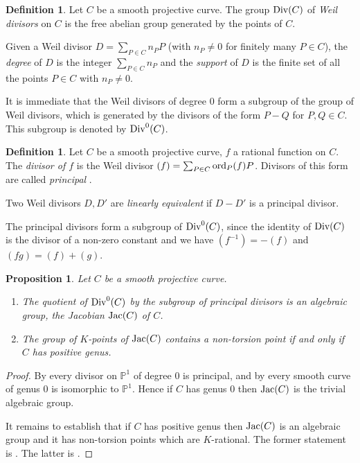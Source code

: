\documentclass{amsart}
\theoremstyle{plain}
\newtheorem{prop}[thm]{Proposition}
\theoremstyle{definition}
\newtheorem{defn}[thm]{Definition}
\newcommand{\Jac}{\textnormal{Jac}}
\newcommand{\Div}{\textnormal{Div}}
\newcommand{\ord}{\textnormal{ord}}
\begin{document}
\begin{defn}
	Let $C$ be a smooth projective curve. The group $\Div(C)$ of \emph{Weil divisors} on $C$ is the free abelian group generated by the points of $C$.
	
	Given a Weil divisor $D=\sum_{P \in C} n_P P$ (with $n_P \neq 0$ for finitely many $P \in C$), the \emph{degree} of $D$ is the integer $\sum_{P \in C} n_P$ and the \emph{support} of $D$ is the finite set of all the points $P\in C$ with $n_P\neq 0$. 
\end{defn}

It is immediate that the Weil divisors of degree $0$ form a subgroup of the group of Weil divisors, which is generated by the divisors of the form $P-Q$ for $P, Q \in C$. This subgroup is denoted by $\Div^0(C)$.

\begin{defn}
	Let $C$ be a smooth projective curve, $f$ a rational function on $C$. The \emph{divisor of $f$} is the Weil divisor $(f)=\sum_{P \in C} \ord_P(f) P$. Divisors of this form are called \emph{principal} .
	
	Two Weil divisors $D,D'$ are \emph{linearly equivalent} if $D-D'$ is a principal divisor.
\end{defn}

The principal divisors form a subgroup of $\Div^0(C)$, since the identity of $\Div(C)$ is the divisor of a non-zero constant and we have $(f^{-1})=-(f)$ and $(fg)=(f)+(g)$.

\begin{prop}\label{fact:jacobians}
	Let $C$ be a smooth projective curve.
	\begin{enumerate}
		\item The quotient of $\Div^0(C)$ by the subgroup of principal divisors is an algebraic group, the \emph{Jacobian} $\Jac(C)$ of $C$. 
		\item The group of $K$-points of $\Jac(C)$ contains a non-torsion point if and only if $C$ has positive genus.
	\end{enumerate}
\end{prop}

\begin{proof}
	By \cite[Proposition A.2.1.3]{HS} every divisor on $\mathbb{P}^1$ of degree $0$ is principal, and by \cite[Theorem A.4.3.1]{HS} every smooth curve of genus $0$ is isomorphic to $\mathbb{P}^1$. Hence if $C$ has genus $0$ then $\Jac(C)$ is the trivial algebraic group.
	
	It remains to establish that if $C$ has positive genus then $\Jac(C)$ is an algebraic group and it has non-torsion points which are $K$-rational. The former statement is \cite[Theorem A.8.1.1]{HS}. The latter is \cite[Theorem A in Appendix]{Rosen}.
\end{proof}
\end{document}
